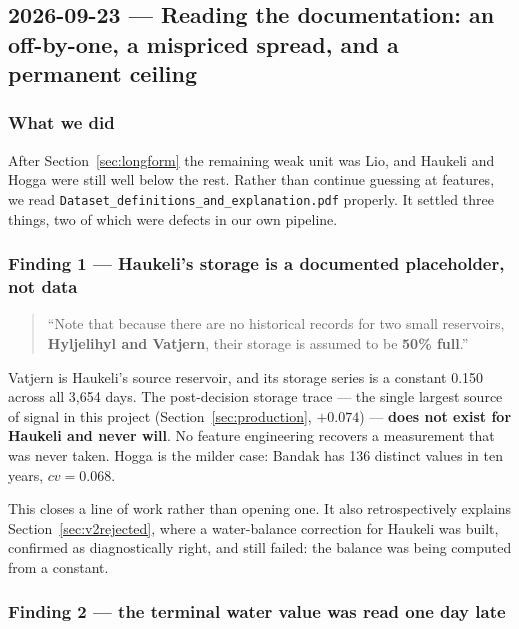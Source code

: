 \subsection{2026-09-23 --- Reading the documentation: an off-by-one, a mispriced spread, and a permanent ceiling}
\label{sec:docs}

\subsubsection*{What we did}

After Section~\ref{sec:longform} the remaining weak unit was Lio, and Haukeli and Hogga were
still well below the rest. Rather than continue guessing at features, we read
\texttt{Dataset\_definitions\_and\_explanation.pdf} properly. It settled three things, two of
which were defects in our own pipeline.

\subsubsection*{Finding 1 --- Haukeli's storage is a documented placeholder, not data}

\begin{quote}
``Note that because there are no historical records for two small reservoirs, \textbf{Hyljelihyl
and Vatjern}, their storage is assumed to be \textbf{50\% full}.''
\end{quote}

\begin{finding}
Vatjern is Haukeli's source reservoir, and its storage series is a constant 0.150 across all
3{,}654 days. The post-decision storage trace --- the single largest source of signal in this
project (Section~\ref{sec:production}, $+0.074$) --- \textbf{does not exist for Haukeli and never
will}. No feature engineering recovers a measurement that was never taken. Hogga is the milder
case: Bandak has 136 distinct values in ten years, $cv = 0.068$.
\end{finding}

This closes a line of work rather than opening one. It also retrospectively explains
Section~\ref{sec:v2rejected}, where a water-balance correction for Haukeli was built, confirmed
as diagnostically right, and still failed: the balance was being computed from a constant.

\subsubsection*{Finding 2 --- the terminal water value was read one day late}

